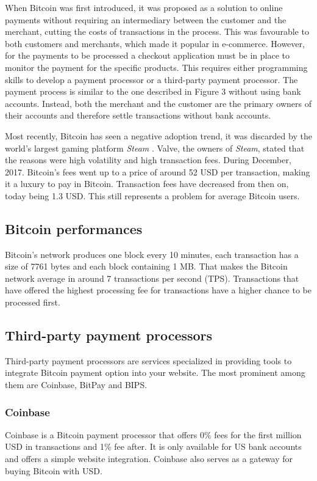 \documentclass{ferseminar}
\begin{document}
When Bitcoin was first introduced, it was proposed as a solution to online payments without requiring an intermediary between the customer and the merchant, cutting the costs of transactions in the process. This was favourable to both customers and merchants, which made it popular in e-commerce. However, for the payments to be processed a checkout application must be in place to monitor the payment for the specific products. This requires either programming skills to develop a payment processor or a third-party payment processor. The payment process is similar to the one described in Figure 3 without using bank accounts. Instead, both the merchant and the customer are the primary owners of their accounts and therefore settle transactions without bank accounts.

Most recently, Bitcoin has seen a negative adoption trend, it was discarded by the world's largest gaming platform \textit{Steam} \cite{Steam}. Valve, the owners of \textit{Steam}, stated that the reasons were high volatility and high transaction fees. During December, 2017. Bitcoin's fees went up to a price of around 52 USD per transaction, making it a luxury to pay in Bitcoin. Transaction fees have decreased from then on, today being 1.3 USD. This still represents a problem for average Bitcoin users.


\subsection{Bitcoin performances}
Bitcoin's network produces one block every 10 minutes, each transaction has a size of 7761 bytes and each block containing 1 MB. That makes the Bitcoin network average in around 7 transactions per second (TPS). Transactions that have offered the highest processing fee for transactions have a higher chance to be processed first.


\subsection{Third-party payment processors}
Third-party payment processors are services specialized in providing tools to integrate Bitcoin payment option into your website. The most prominent among them are Coinbase, BitPay and BIPS. 

\subsubsection{Coinbase}
Coinbase is a Bitcoin payment processor that offers 0\% fees for the first million USD in transactions and 1\% fee after. It is only available for US bank accounts and offers a simple website integration. Coinbase also serves as a gateway for buying Bitcoin with USD.
\end{document}
